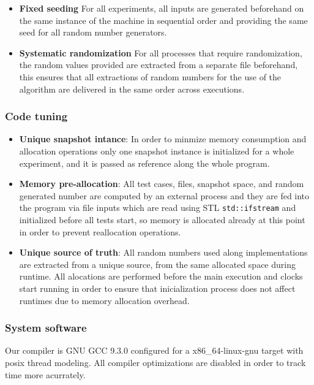 \begin{itemize}
    \item{\textbf{Fixed seeding}
    For all experiments, all inputs are generated beforehand on the same instance of the machine in sequential order and providing the same seed for all random number generators.}
    
    \item{\textbf{Systematic randomization}
    For all processes that require randomization, the random values provided are extracted from a separate file beforehand, this ensures that all extractions of random numbers for the use of the algorithm are delivered in the same order across executions.}
\end{itemize}

\subsubsection{Code tuning}
\begin{itemize}
    \item{\textbf{Unique snapshot intance}: 
    In order to minmize memory consumption and allocation operations only one snapshot instance is initialized for a whole experiment, and it is passed as reference along the whole program.}
    \item{\textbf{Memory pre-allocation}: 
    All test cases, files, snapshot space, and random generated number are computed by an external process and they are fed into the program via file inputs which are read using STL \texttt{std::ifstream} and initialized before all tests start, so memory is allocated already at this point in order to prevent reallocation operations.}
    \item{\textbf{Unique source of truth}:
    All random numbers used along implementations are extracted from a unique source, from the same allocated space during runtime. All alocations are performed before the main execution and clocks start running in order to ensure that inicialization process does not affect runtimes due to memory allocation overhead.}
\end{itemize}

\subsubsection{System software}
Our compiler is GNU GCC 9.3.0 configured for a x86\_64-linux-gnu target with posix thread modeling. All compiler optimizations are disabled in order to track time more acurrately.
